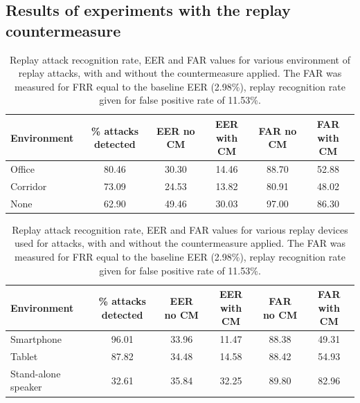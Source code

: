 %

\subsection{Results of experiments with the replay countermeasure}


\begin{table}
\begin{center}
    \begin{tabular}{ l || c c c c c }
    \hline
     	 Environment & \% attacks detected & EER no CM & EER with CM & FAR no CM & FAR with CM\\ 

 \hline \hline
Office   & 80.46 & 30.30 & 14.46 & 88.70 & 52.88\\
Corridor & 73.09 & 24.53 & 13.82 & 80.91 & 48.02\\
None & 62.90 & 49.46 & 30.03 & 97.00 & 86.30\\
\hline
    \end{tabular}
    \caption{Replay attack recognition rate, EER and FAR values for various environment of replay attacks, with and without the countermeasure applied. The FAR was measured for FRR equal to the baseline EER (2.98\%), replay recognition rate given for false positive rate of 11.53\%.}
		\label{tab::results_CM_rooms}
   \end{center}
\end{table}


\begin{table}
\begin{center}
    \begin{tabular}{ l || c c c c c }
    \hline
     	 Environment & \% attacks detected & EER no CM & EER with CM & FAR no CM & FAR with CM\\ 

 \hline \hline
Smartphone   & 96.01 & 33.96 & 11.47 & 88.38 & 49.31\\
Tablet & 87.82 & 34.48 & 14.58 & 88.42 & 54.93\\
Stand-alone speaker & 32.61 & 35.84 & 32.25 & 89.80 & 82.96\\
\hline
    \end{tabular}
    \caption{Replay attack recognition rate, EER and FAR values for various replay devices used for attacks, with and without the countermeasure applied. The FAR was measured for FRR equal to the baseline EER (2.98\%), replay recognition rate given for false positive rate of 11.53\%.}
		\label{tab::results_CM_spk}
   \end{center}
\end{table}


